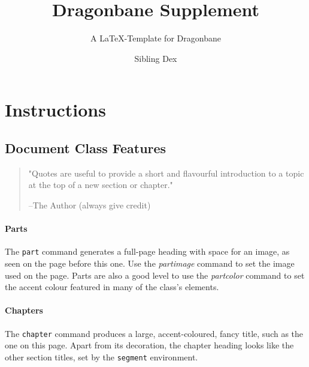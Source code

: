 \documentclass[
]{dragonbane-supplement}
\title{Dragonbane Supplement}
\subtitle{A LaTeX-Template for Dragonbane}
\author{Sibling Dex}
\begin{document}
\maketitle

\part{Instructions}

\chapter{Document Class Features}

\begin{segment}

\begin{quote}
    "Quotes are useful to provide a short and flavourful introduction to a topic at the top of a new section or chapter."

    --The Author (always give credit)
\end{quote}

\subsection{Parts}
The \texttt{part} command generates a full-page heading with space for an image, as seen on the page before this one. Use the \textit{partimage} command to set the image used on the page. Parts are also a good level to use the \textit{partcolor} command to set the accent colour featured in many of the class's elements.

\subsection{Chapters}
The \texttt{chapter} command produces a large, accent-coloured, fancy title, such as the one on this page. Apart from its decoration, the chapter heading looks like the other section titles, set by the \texttt{segment} environment.


\end{segment}
\end{document}
